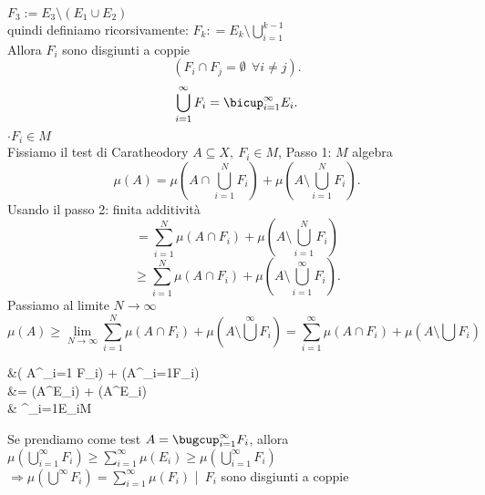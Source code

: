 \documentclass[12px]{article}
\begin{document}
\begin{dimo}
 $F_3 := E_3\setminus(E_1\cup E_2)$\\
 quindi definiamo ricorsivamente:
 $F_k : = E_k\setminus\bigcup_{i=1} ^{k-1}$\\
 Allora  $F_i$ sono disgiunti a coppie 
 \[
	 (F_i\cap F_j = \emptyset \ \ \forall i\neq j)
 .\] 
 \[
	 \bigcup_{i=1}^\infty F_i = \bicup_{i=1}^\infty E_i
 .\] 
 $\cdot F_i\in M$\\
 Fissiamo il test di Caratheodory $A\subseteq X, \ F_i\in M$, Passo 1: $M$ algebra\\
   \[
	  \mu(A) = \mu(A\cap\bigcup^N_{i=1}F_i) + \mu(A\setminus \bigcup_{i=1}^N F_i)
 .\] 
 Usando il passo 2: finita additività
 \[
	 = \sum^N_{i=1}\mu(A\cap F_i) + \mu (A\setminus\bigcup^N_{i=1}F_i)
 \] 
 \[
	 \geq \sum^N_{i=1} \mu(A\cap F_i) + \mu(A\setminus\bigcup^\infty_{i=1}F_i)
 .\] 
 Passiamo al limite $ N \rightarrow\infty$
\[\mu (A) \geq \lim_{N \rightarrow\infty} \sum^N_{i=1}\mu(A\cap F_i) + \mu(A\setminus \bigcup^\infty F_i) = \sum^\infty_{i=1} \mu(A\cap F_i) + \mu(A \setminus \bigcup F_i)\]
\begin{center}
\begin{aligend}
	
	&\dicentertyle\geq \mu ( A\cap \bigcup^\infty_{i=1} F_i) + \mu (A\setminus \bigcup^\infty_{i=1}F_i)\\
	&= \mu(A\cap \bigcup^\infty E_i) + \mu(A\setminus \bigcup^\infty E_i)\\
	& \Rightarrow \bigcup^\infty_{i=1}E_i\in M
\end{aligend}
\end{center}
Se prendiamo come test $A = \bugcup^\infty_{i=1}F_i$, allora $\mu(\bigcup^\infty_{i=1}F_i)\geq \sum^\infty_{i=1}\mu(E_i)\geq \mu(\bigcup^\infty_{i=1}F_i)$\\
$ \Rightarrow \mu(\bigcup^\infty F_i) = \sum^\infty_{i=1}\mu(F_i)$ |\
$F_i$ sono disgiunti a coppie
 \end{dimo}


	
\end{document}
